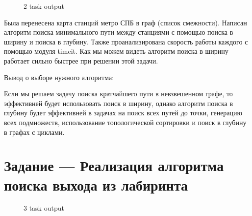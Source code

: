 \documentclass[14pt]{extreport}
\begin{document}
\begin{figure}[H]
\caption{2 task output}
\label{grf2}
\end{figure}

Была перенесена карта станций метро СПБ в граф (список смежности). Написан алгоритм поиска минимального пути между станциями с помощью поиска в ширину и поиска в глубину. Также проанализирована скорость работы каждого с помощью модуля timeit. Как мы можем видеть алгоритм поиска в ширину работает сильно быстрее при решении этой задачи. 

Вывод о выборе нужного алгоритма:

Если мы решаем задачу поиска кратчайшего пути в невзвешенном графе, то эффективней будет использовать поиск в ширину, однако алгоритм поиска в глубину будет эффективней в задачах на поиск всех путей до точки, генерацию всех подмножеств, использование топологической сортировки и поиск в глубину в графах с циклами.


\chapter{Задание --- Реализация алгоритма поиска выхода из лабиринта}


\begin{figure}[H]
\caption{3 task output}
\label{grf2}
\end{figure}
\end{document}
